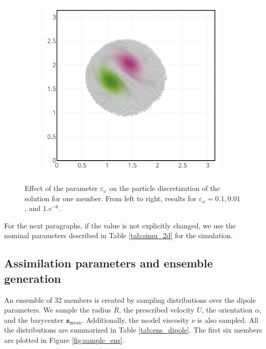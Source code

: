 \begin{figure}[htbp]
\begin{subfigure}{0.3\textwidth}
	\end{subfigure}
	\hfill
	\begin{subfigure}{0.3\textwidth}
		\includegraphics[width=\linewidth]{images/app2d/part_eps_1e-6.png}
	\end{subfigure}
	\caption{Effect of the parameter $\varepsilon_\omega$ on the particle discretization of the solution for one member. From left to right, results for $\varepsilon_\omega = 0.1, 0.01$, and $1.e^{-6}$.}
	\label{fig:eps_effect}
\end{figure}

For the next paragraphs, if the value is not explicitly changed, we use the nominal parameters described in Table \ref{tab:simu_2d} for the simulation.

\subsection{Assimilation parameters and ensemble generation}

An ensemble of 32 members is created by sampling distributions over the dipole parameters. We sample the radius $R$, the prescribed velocity $U$, the orientation $\alpha$, and the barycenter $\bm z_{\text{mean}}$. Additionally, the model viscosity $\nu$ is also sampled. All the distributions are summarized in Table \ref{tab:ens_dipole}. The first six members are plotted in Figure \ref{fig:sample_ens}.

